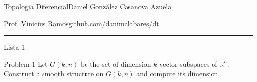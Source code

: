 
%




\begin{minipage}{\textwidth}
	\begin{minipage}{1\textwidth}
		Topologia Diferencial\hfill Daniel González Casanova Azuela
		
		{Prof. Vinicius Ramos\hfill\href{https://github.com/danimalabares/dt}{github.com/danimalabares/dt}}
	\end{minipage}
\end{minipage}\vspace{.2cm}\hrule

\vspace{10pt}
{\huge Lista 1}
\begin{thing1}{Problem 1}\label{p:1}\leavevmode
Let \(G(k,n)\) be the set of dimension \(k\) vector subspaces of \(\mathbb{R}^n\). Construct a smooth structure on \(G(k,n)\) and compute its dimension.
\end{thing1}


